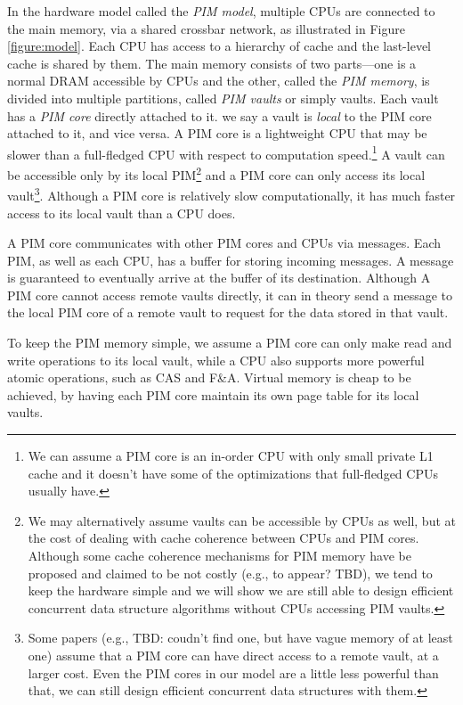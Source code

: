 \documentclass[11pt, letterpaper]{article}   	%
\begin{document}
In the hardware model called the \emph{PIM model}, multiple CPUs are connected to the main
memory, via a shared crossbar network, as illustrated in Figure \ref{figure:model}.
Each CPU has access to a hierarchy of cache and
the last-level cache is shared by them. 
The main memory consists of two parts---one is a normal DRAM accessible by CPUs 
and the other, called the \emph{PIM memory}, is divided into multiple partitions, 
called \emph{PIM vaults} or simply vaults.  
Each vault has a \emph{PIM core} directly attached to it.
we say a vault is \emph{local} to the PIM core attached to it, and vice versa.
A PIM core is a lightweight CPU that may be slower than a full-fledged CPU
with respect to computation speed.\footnote{
We can assume a PIM core is an in-order CPU with only small private L1 cache and 
it doesn't have some of the optimizations that full-fledged CPUs usually have.}
A vault can be accessible only by its local PIM\footnote{
We may alternatively assume vaults can be accessible by CPUs as well, 
but at the cost of dealing with cache coherence between CPUs and PIM cores. 
Although some cache coherence mechanisms for PIM memory have be proposed 
and claimed to be not costly (e.g., \cite{Boroumand16} to appear? TBD), 
we tend to keep the hardware simple and we will show we are still able to 
design efficient concurrent data structure algorithms without CPUs accessing PIM vaults. }
and a PIM core can only access its local vault\footnote{
Some papers (e.g., \cite{} TBD: coudn't find one, but have vague memory of at least one) 
assume that a PIM core can have direct access to a remote vault,
at a larger cost. Even the PIM cores in our model are a little less powerful than that,
we can still design efficient concurrent data structures with them.}.
Although a PIM core is relatively slow computationally,
it has much faster access to its local vault than a CPU does.

A PIM core communicates with other PIM cores and CPUs via messages.
Each PIM, as well as each CPU, has a buffer for storing incoming messages.
A message is guaranteed to eventually arrive at the buffer of its destination.
Although A PIM core cannot access remote vaults directly, it can in theory send a message
to the local PIM core of a remote vault to request for the data stored in that vault.

To keep the PIM memory simple, 
we assume a PIM core can only make read and write operations to its local vault,
while a CPU also supports more powerful atomic operations, such as CAS and F\&A.
Virtual memory is cheap to be achieved, by having each PIM core maintain 
its own page table for its local vaults. 
\end{document}
